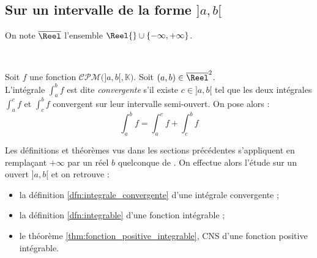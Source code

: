 \documentclass[11pt,a4paper,fleqn,pdftex]{report}
\begin{document}
\subsection{Sur un intervalle de la forme $]a,b[$} %
\label{sub:intervalle_ouvert}
\begin{dfn}
     On note $\overline{\Reel}$ l'ensemble $\Reel{} \cup \{ -\infty, +\infty \}$. 
\end{dfn}
 \\ %
\begin{dfn}
     Soit $f$ une fonction $\mathcal{CPM}\big( ]a,b[,\mathbb{K}\big)$. Soit $(a,b) \in \overline{\Reel}^2$. \\
     L'intégrale $\int_a^b f$ est dite \emph{convergente} s'il existe $c\in ]a,b[$ tel que les deux intégrales $\int_a^c f$ et $\int_c^b f$ convergent sur leur intervalle semi-ouvert. On pose alors : 
     \begin{equation}
     \int_a^b f = \int_a^c f + \int_c^b f
     \end{equation}
\end{dfn}
Les définitions et théorèmes vus dans les sections précédentes s'appliquent en remplaçant $+\infty$ par un réel $b$ quelconque de \Reel{}. On effectue alors l'étude sur un ouvert $]a,b[$ et on retrouve : 
\begin{itemize}[label=$-$]
    \item la définition \ref{dfn:integrale_convergente} d'une intégrale convergente ;
    \item la définition \ref{dfn:integrable} d'une fonction intégrable ;
    \item le théorème \ref{thm:fonction_positive_integrable}, \gls{CNS} d'une fonction positive intégrable.
\end{itemize}
\end{document}
